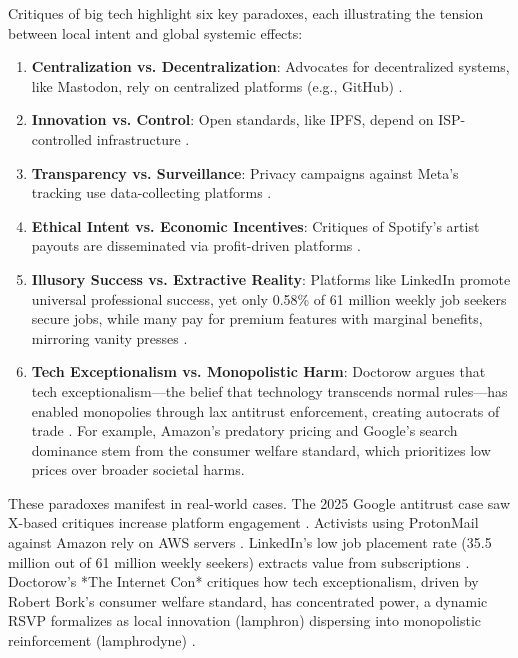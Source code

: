 \documentclass{article}
\begin{document}
Critiques of big tech highlight six key paradoxes, each illustrating the tension between local intent and global systemic effects:

\begin{enumerate}
    \item \textbf{Centralization vs. Decentralization}: Advocates for decentralized systems, like Mastodon, rely on centralized platforms (e.g., GitHub) \cite{mastodon2025}.
    \item \textbf{Innovation vs. Control}: Open standards, like IPFS, depend on ISP-controlled infrastructure \cite{ipfs2025}.
    \item \textbf{Transparency vs. Surveillance}: Privacy campaigns against Meta’s tracking use data-collecting platforms \cite{meta2025}.
    \item \textbf{Ethical Intent vs. Economic Incentives}: Critiques of Spotify’s artist payouts are disseminated via profit-driven platforms \cite{spotify2025}.
    \item \textbf{Illusory Success vs. Extractive Reality}: Platforms like LinkedIn promote universal professional success, yet only 0.58\% of 61 million weekly job seekers secure jobs, while many pay for premium features with marginal benefits, mirroring vanity presses \cite{kinsta2025linkedin,ghedau2025linkedin,amos2024}.
    \item \textbf{Tech Exceptionalism vs. Monopolistic Harm}: Doctorow argues that tech exceptionalism—the belief that technology transcends normal rules—has enabled monopolies through lax antitrust enforcement, creating autocrats of trade \cite{doctorow2023internetcon}. For example, Amazon’s predatory pricing and Google’s search dominance stem from the consumer welfare standard, which prioritizes low prices over broader societal harms.
\end{enumerate}

These paradoxes manifest in real-world cases. The 2025 Google antitrust case saw X-based critiques increase platform engagement \cite{doj2025}. Activists using ProtonMail against Amazon rely on AWS servers \cite{amazon2025}. LinkedIn’s low job placement rate (35.5 million out of 61 million weekly seekers) extracts value from subscriptions \cite{kinsta2025linkedin}. Doctorow’s *The Internet Con* critiques how tech exceptionalism, driven by Robert Bork’s consumer welfare standard, has concentrated power, a dynamic RSVP formalizes as local innovation (lamphron) dispersing into monopolistic reinforcement (lamphrodyne) \cite{doctorow2023internetcon}.
\end{document}

